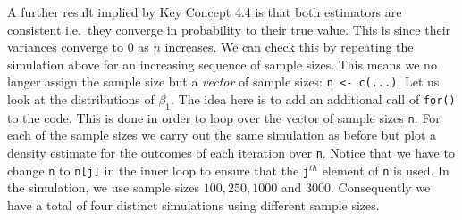 \documentclass[]{book}
\theoremstyle{definition}
\theoremstyle{definition}
\theoremstyle{definition}
\theoremstyle{remark}
\begin{document}
A further result implied by Key Concept 4.4 is that both estimators are
consistent i.e.~they converge in probability to their true value. This
is since their variances converge to \(0\) as \(n\) increases. We can
check this by repeating the simulation above for an increasing sequence
of sample sizes. This means we no langer assign the sample size but a
\emph{vector} of sample sizes: \texttt{n\ \textless{}-\ c(...)}. Let us
look at the distributions of \(\beta_1\). The idea here is to add an
additional call of \texttt{for()} to the code. This is done in order to
loop over the vector of sample sizes \texttt{n}. For each of the sample
sizes we carry out the same simulation as before but plot a density
estimate for the outcomes of each iteration over \texttt{n}. Notice that
we have to change \texttt{n} to \texttt{n{[}j{]}} in the inner loop to
ensure that the \texttt{j}\(^{th}\) element of \texttt{n} is used. In
the simulation, we use sample sizes \(100, 250, 1000\) and \(3000\).
Consequently we have a total of four distinct simulations using
different sample sizes.
\end{document}
